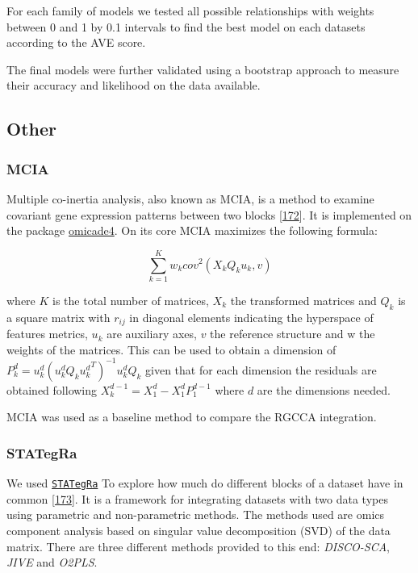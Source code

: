 \documentclass[
  12pt,
  a4paper,
  twoside,
  openright]{book}
\begin{document}
For each family of models we tested all possible relationships with weights between 0 and 1 by 0.1 intervals to find the best model on each datasets according to the AVE score.

The final models were further validated using a bootstrap approach to measure their accuracy and likelihood on the data available.

\hypertarget{other}{%
\subsection{Other}\label{other}}

\hypertarget{mcia}{%
\subsubsection{MCIA}\label{mcia}}

Multiple co-inertia analysis, also known as MCIA, is a method to examine covariant gene expression patterns between two blocks {[}\protect\hyperlink{ref-meng2014}{172}{]}.
It is implemented on the package \href{https://bioconductor.org/packages/omicade4}{omicade4}.
On its core MCIA maximizes the following formula:

\[
\sum_{k=1}^K w_k {cov}^2 (X_k Q_k u_k, v)
\]

where \(K\) is the total number of matrices, \(X_k\) the transformed matrices and \(Q_k\) is a square matrix with \(r_{ij}\) in diagonal elements indicating the hyperspace of features metrics, \(u_k\) are auxiliary axes, \(v\) the reference structure and w the weights of the matrices.
This can be used to obtain a dimension of \(P_k^d=u_k^d(u_k^d Q_k {u_k^d}^T)^{-1} u_k^d Q_k\) given that for each dimension the residuals are obtained following \(X_k^{d-1} = X_1^d- X_1^d P_1^{d-1}\) where \(d\) are the dimensions needed.

MCIA was used as a baseline method to compare the RGCCA integration.

\hypertarget{stategra}{%
\subsubsection{STATegRa}\label{stategra}}

We used \href{https://bioconductor.org/packages/STATegRa}{\texttt{STATegRa}} To explore how much do different blocks of a dataset have in common {[}\protect\hyperlink{ref-planell2021}{173}{]}.
It is a framework for integrating datasets with two data types using parametric and non-parametric methods.
The methods used are omics component analysis based on singular value decomposition (SVD) of the data matrix.
There are three different methods provided to this end: \emph{DISCO-SCA}, \emph{JIVE} and \emph{O2PLS}.
\end{document}
